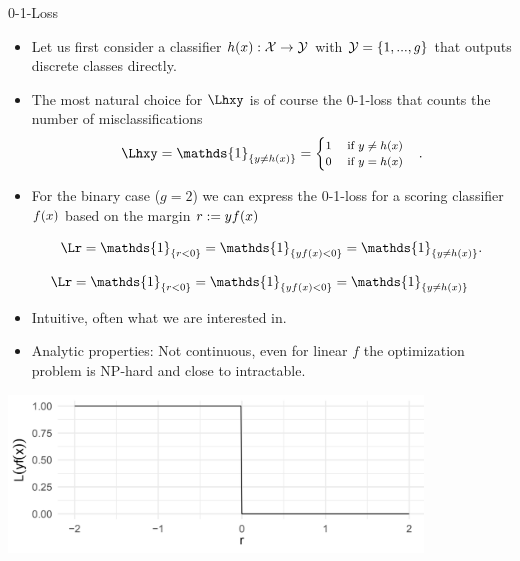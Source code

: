 \begin{vbframe}{0-1-Loss}

\begin{itemize}
  \item Let us first consider a classifier $h(x): \mathcal{X} \to \mathcal{Y}$ with $\mathcal{Y} = \{1, ..., g\}$ that outputs discrete classes directly. 
  \item The most natural choice for $\Lhxy$ is of course the 0-1-loss that counts the number of misclassifications
  $$
  \Lhxy = \mathds{1}_{\{y \ne \hx\}} =
     \footnotesize \begin{cases} 1 \quad \text{ if } y \ne \hx \\ 0 \quad    \text{ if } y = \hx  \end{cases}.
  $$
  \item For the binary case ($g = 2$) we can express the 0-1-loss for a scoring classifier $f(x)$ based on the margin $r := yf(x)$

  $$
  \Lr = \mathds{1}_{\{r < 0\}} = \mathds{1}_{\{y\fx < 0\}} = \mathds{1}_{\{y \neq \hx\}}.
  $$

\end{itemize}


\framebreak 

$$
  \Lr = \mathds{1}_{\{r < 0\}} = \mathds{1}_{\{y\fx < 0\}} = \mathds{1}_{\{y \neq \hx\}} 
$$

\begin{itemize}
\item Intuitive, often what we are interested in.
\item Analytic properties:  Not continuous, even for linear $f$ the optimization problem is NP-hard and close to intractable.
\end{itemize}

\begin{center}
\includegraphics[width = 11cm ]{figure_man/0-1-loss.png} \\
\end{center}


\end{vbframe}


